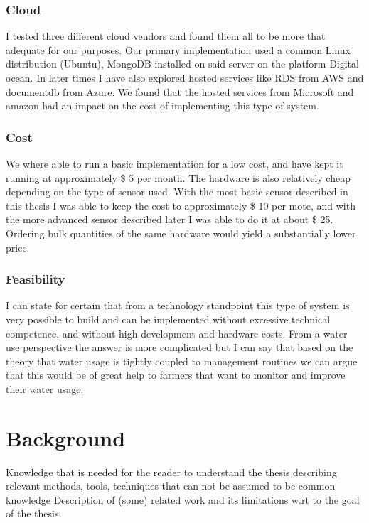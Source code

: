 \documentclass[]{uiophd}
\begin{document}
\subsection{Cloud}
I tested three different cloud vendors and found them all to be more that adequate for our purposes. Our primary implementation used a common Linux distribution (Ubuntu), MongoDB installed on said server on the platform Digital ocean. In later times I have also explored hosted services like RDS from AWS and documentdb from Azure. We found that the hosted services from Microsoft and amazon had an impact on the cost of implementing this type of system.

\subsection{Cost}
We where able to run a basic implementation for a low cost, and have kept it running at approximately \$ 5 per month. The hardware is also relatively cheap depending on the type of sensor used. With the most basic sensor described in this thesis I was able to keep the cost to approximately \$ 10 per mote, and with the more advanced sensor described later I was able to do it at about \$ 25. Ordering bulk quantities of the same hardware would yield a substantially lower price.

\subsection{Feasibility}
I can state for certain that from a technology standpoint this type of system is very possible to build and can be implemented without excessive technical competence, and without high development and hardware costs. From a water use perspective the answer is more complicated but I can say that based on the theory that water usage is tightly coupled to management routines we can argue that this would be of great help to farmers that want to monitor and improve their water usage.


\chapter{Background}

Knowledge that is needed for the reader to understand the thesis describing relevant methods, tools, techniques that can not be assumed to be common knowledge
Description of (some) related work and its limitations w.rt to the goal of the thesis
\end{document}
